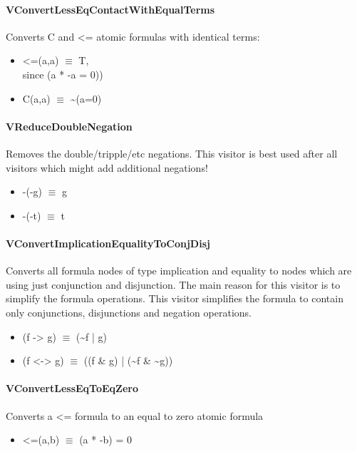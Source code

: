 \documentclass{article}
\begin{document}
	\paragraph{VConvertLessEqContactWithEqualTerms}
				Converts C and <= atomic formulas with identical terms:
				\begin{itemize}
					\item <=(a,a) $\equiv$ T, \\
						since (a * -a = 0))
					\item C(a,a) $\equiv$ \textasciitilde(a=0)
				\end{itemize}

	\paragraph{VReduceDoubleNegation}
				Removes the double/tripple/etc negations.
				This visitor is best used after all visitors which might add additional negations!
				\begin{itemize}
					\item -(-g) $\equiv$ g
					\item -(-t) $\equiv$ t
				\end{itemize}

	\paragraph{VConvertImplicationEqualityToConjDisj}
				Converts all formula nodes of type implication and equality to nodes
				which are using just conjunction and disjunction. The main reason for this visitor is to simplify the formula operations.
				This visitor simplifies the formula to contain only conjunctions, disjunctions and negation operations.
				\begin{itemize}
					\item (f -> g)  $\equiv$ (\textasciitilde f | g)
					\item (f <-> g) $\equiv$ ((f \& g) | (\textasciitilde f \& \textasciitilde g))
				\end{itemize}

	\paragraph{VConvertLessEqToEqZero}
				Converts a <= formula to an equal to zero atomic formula
				\begin{itemize}
					\item <=(a,b) $\equiv$ (a * -b) = 0
				\end{itemize}
\end{document}
